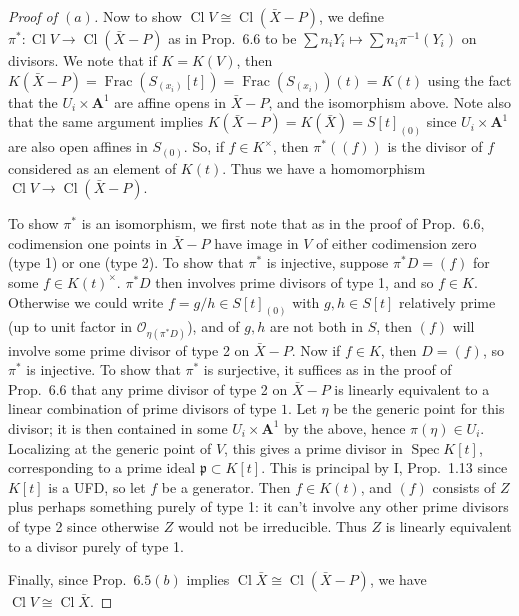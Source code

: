 \documentclass[12pt,letterpaper]{article}
\theoremstyle{definition}
\theoremstyle{remark}
\numberwithin{equation}{section}
\numberwithin{figure}{problem}
\DeclareMathOperator{\Spec}{Spec}
\DeclareMathOperator{\Frac}{Frac}
\DeclareMathOperator{\Cl}{Cl}
\newcommand{\OO}{\mathcal{O}}
\begin{document}
\begin{proof}[Proof of $(a)$]
  \par Now to show $\Cl V \cong \Cl(\bar{X} - P)$, we define $\pi^*\colon\Cl V \to \Cl(\bar{X} - P)$ as in Prop.~6.6 to be $\sum n_iY_i \mapsto \sum n_i\pi^{-1}(Y_i)$ on divisors. We note that if $K = K(V)$, then $K(\bar{X} - P) = \Frac(S_{(x_i)}[t]) = \Frac(S_{(x_i)})(t) = K(t)$ using the fact that the $U_i \times \mathbf{A}^1$ are affine opens in $\bar{X} - P$, and the isomorphism above. Note also that the same argument implies $K(\bar{X} - P) = K(\bar{X}) = S[t]_{(0)}$ since $U_i \times \mathbf{A}^1$ are also open affines in $S_{(0)}$. So, if $f \in K^\times$, then $\pi^*((f))$ is the divisor of $f$ considered as an element of $K(t)$. Thus we have a homomorphism $\Cl V \to \Cl(\bar{X} - P)$.
  \par To show $\pi^*$ is an isomorphism, we first note that as in the proof of Prop.~6.6, codimension one points in $\bar{X} - P$ have image in $V$ of either codimension zero (type 1) or one (type 2). To show that $\pi^*$ is injective, suppose $\pi^*D = (f)$ for some $f \in K(t)^\times$. $\pi^*D$ then involves prime divisors of type 1, and so $f \in K$. Otherwise we could write $f = g/h \in S[t]_{(0)}$ with $g,h \in S[t]$ relatively prime (up to unit factor in $\OO_{\eta(\pi^*D)}$), and of $g,h$ are not both in $S$, then $(f)$ will involve some prime divisor of type 2 on $\bar{X} - P$. Now if $f \in K$, then $D = (f)$, so $\pi^*$ is injective. To show that $\pi^*$ is surjective, it suffices as in the proof of Prop.~6.6 that any prime divisor of type 2 on $\bar{X} - P$ is linearly equivalent to a linear combination of prime divisors of type $1$. Let $\eta$ be the generic point for this divisor; it is then contained in some $U_i \times \mathbf{A}^1$ by the above, hence $\pi(\eta) \in U_i$. Localizing at the generic point of $V$, this gives a prime divisor in $\Spec K[t]$, corresponding to a prime ideal $\mathfrak{p} \subset K[t]$. This is principal by I, Prop.~1.13 since $K[t]$ is a UFD, so let $f$ be a generator. Then $f \in K(t)$, and $(f)$ consists of $Z$ plus perhaps something purely of type 1: it can't involve any other prime divisors of type 2 since otherwise $Z$ would not be irreducible. Thus $Z$ is linearly equivalent to a divisor purely of type 1.
  \par Finally, since Prop.~$6.5(b)$ implies $\Cl \bar{X} \cong \Cl(\bar{X} - P)$, we have $\Cl V \cong \Cl \bar{X}$.
\end{proof}
\end{document}
